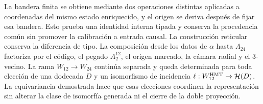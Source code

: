 \enlargethispage{3\baselineskip}
La bandera finita se obtiene mediante dos operaciones distintas aplicadas a
coordenadas del mismo estado enriquecido, y el origen se deriva después de
fijar esa bandera. Esto prueba una identidad interna tipada y conserva la
procedencia común sin promover la calibración a entrada causal. La
construcción reticular conserva la diferencia de tipo. La composición desde
los datos de \(\alpha\) hasta \(\Lambda_{24}\) factoriza por el código, el
pegado \(A_2^{12}\), el origen marcado, la cámara radial y el 3-vecino. La
rama \(W_{12}\to W_{24}\) continúa separada y queda determinada para toda
elección de una dodecada \(D\) y un isomorfismo de incidencia
\(\ell:W_{12}^{\rm HMT}\to\mathcal H(D)\). La equivariancia demostrada hace
que esas elecciones coordinen la representación sin alterar la clase de
isomorfía generada ni el cierre de la doble proyección.
